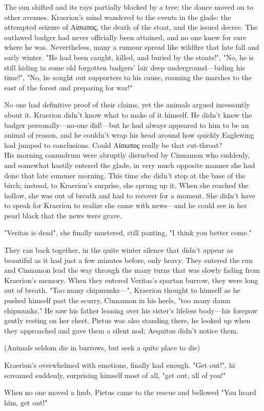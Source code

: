 The sun shifted and its rays partially blocked by a tree; the dance moved on to other avenues. Kraerion's mind wandered to the events in the glade: the attempted seizure of Αίσωπος, the death of the stoat, and the issued decree. The outlawed badger had never officially been attained, and no one knew for sure where he was. Nevertheless, many a rumour spread like wildfire that late fall and early winter. "He had been caught, killed, and buried by the stoats!", "No, he is still hiding in some old forgotten badgers' lair deep underground---biding his time!", "No, he sought out supporters to his cause, roaming the marshes to the east of the forest and preparing for war!" %

No one had definitive proof of their claims, yet the animals argued incessantly about it. Kraerion didn't know what to make of it himself. He didn't know the badger personally---no-one did!---but he had always appeared to him to be an animal of reason, and he couldn't wrap his head around how quickly Eaglewing had jumped to conclusions. Could Αίσωπος really be that cut-throat?\\

His morning conundrum were abruptly disturbed by Cinnamon who suddenly, and somewhat hastily entered the glade, in very much opposite manner she had done that late summer morning. This time she didn't stop at the base of the birch; instead, to Kraerion's surprise, she sprung up it. When she reached the hollow, she was out of breath and had to recover for a moment. She didn't have to speak for Kraerion to realize she came with news---and he could see in her pearl black that the news were grave.

"Veritas is dead", she finally mustered, still panting, "I think you better come."

They ran back together, in the quite winter silence that didn't appear as beautiful as it had just a few minutes before, only heavy. They entered the run and Cinnamon lead the way through the many turns that was slowly fading from Kraerion's memory. When they entered Veritas's spartan burrow, they were long out of breath. "Too many chipmunks---", Kraerion thought to himself as he pushed himself past the scurry, Cinnamon in his heels, "too many damn chipmunks." He saw his father leaning over his sister's lifeless body---his forepaw gently resting on her chest. Pietus was also standing there, he looked up when they approached and gave them a silent nod; Aequitus didn't notice them.

(Animals seldom die in burrows, but seek a quite place to die)

Kraerion's overwhelmed with emotions, finally had enough. 
"Get out!", hi screamed suddenly, surprising himself most of all, "get out, all of you!" 

When no one moved a limb, Pietus came to the rescue and bellowed "You heard him, get out!"



